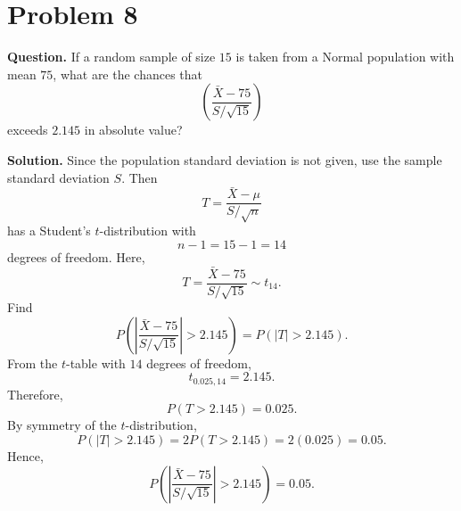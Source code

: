 \documentclass[11pt]{article}
\begin{document}
\section*{Problem 8}

\textbf{Question.} If a random sample of size $15$ is taken from a Normal population with mean $75$, what are the chances that
\[
\left(\frac{\bar X-75}{S/\sqrt{15}}\right)
\]
exceeds $2.145$ in absolute value?

\textbf{Solution.} Since the population standard deviation is not given, use the sample standard deviation $S$. Then
\[
T=\frac{\bar X-\mu}{S/\sqrt{n}}
\]
has a Student's $t$-distribution with
\[
n-1=15-1=14
\]
degrees of freedom. Here,
\[
T=\frac{\bar X-75}{S/\sqrt{15}}\sim t_{14}.
\]
Find
\[
P\left(\left|\frac{\bar X-75}{S/\sqrt{15}}\right|>2.145\right)=P(|T|>2.145).
\]
From the $t$-table with $14$ degrees of freedom,
\[
t_{0.025,14}=2.145.
\]
Therefore,
\[
P(T>2.145)=0.025.
\]
By symmetry of the $t$-distribution,
\[
P(|T|>2.145)=2P(T>2.145)=2(0.025)=0.05.
\]
Hence,
\[
\boxed{P\left(\left|\frac{\bar X-75}{S/\sqrt{15}}\right|>2.145\right)=0.05}.
\]

\newpage
\end{document}
